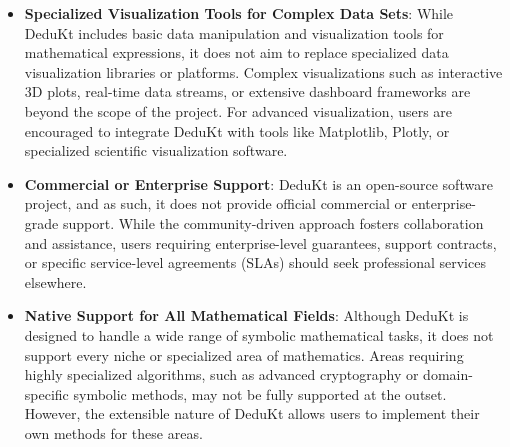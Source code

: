 \begin{itemize}
    \item \textbf{Specialized Visualization Tools for Complex Data Sets}: While DeduKt includes basic data manipulation and visualization tools for mathematical expressions, it does not aim to replace specialized data visualization libraries or platforms.
    Complex visualizations such as interactive 3D plots, real-time data streams, or extensive dashboard frameworks are beyond the scope of the project.
    For advanced visualization, users are encouraged to integrate DeduKt with tools like Matplotlib, Plotly, or specialized scientific visualization software.

    \item \textbf{Commercial or Enterprise Support}: DeduKt is an open-source software project, and as such, it does not provide official commercial or enterprise-grade support.
    While the community-driven approach fosters collaboration and assistance, users requiring enterprise-level guarantees, support contracts, or specific service-level agreements (SLAs) should seek professional services elsewhere.

    \item \textbf{Native Support for All Mathematical Fields}: Although DeduKt is designed to handle a wide range of symbolic mathematical tasks, it does not support every niche or specialized area of mathematics.
    Areas requiring highly specialized algorithms, such as advanced cryptography or domain-specific symbolic methods, may not be fully supported at the outset.
    However, the extensible nature of DeduKt allows users to implement their own methods for these areas.
\end{itemize}
